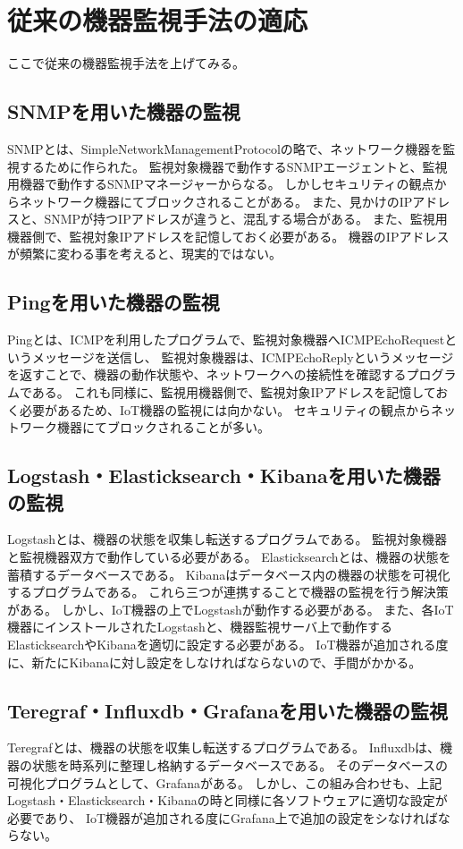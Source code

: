 \section{従来の機器監視手法の適応}
ここで従来の機器監視手法を上げてみる。
\subsection{SNMPを用いた機器の監視}
	SNMPとは、SimpleNetworkManagementProtocolの略で、ネットワーク機器を監視するために作られた。
	監視対象機器で動作するSNMPエージェントと、監視用機器で動作するSNMPマネージャーからなる。
	しかしセキュリティの観点からネットワーク機器にてブロックされることがある。
	また、見かけのIPアドレスと、SNMPが持つIPアドレスが違うと、混乱する場合がある。
	また、監視用機器側で、監視対象IPアドレスを記憶しておく必要がある。
	機器のIPアドレスが頻繁に変わる事を考えると、現実的ではない。
\subsection{Pingを用いた機器の監視}
	Pingとは、ICMPを利用したプログラムで、監視対象機器へICMPEchoRequestというメッセージを送信し、
	監視対象機器は、ICMPEchoReplyというメッセージを返すことで、機器の動作状態や、ネットワークへの接続性を確認するプログラムである。
	これも同様に、監視用機器側で、監視対象IPアドレスを記憶しておく必要があるため、IoT機器の監視には向かない。
	セキュリティの観点からネットワーク機器にてブロックされることが多い。
\subsection{Logstash・Elasticksearch・Kibanaを用いた機器の監視}
	Logstashとは、機器の状態を収集し転送するプログラムである。
	監視対象機器と監視機器双方で動作している必要がある。
	Elasticksearchとは、機器の状態を蓄積するデータベースである。
	Kibanaはデータベース内の機器の状態を可視化するプログラムである。
	これら三つが連携することで機器の監視を行う解決策がある。
	しかし、IoT機器の上でLogstashが動作する必要がある。
	また、各IoT機器にインストールされたLogstashと、機器監視サーバ上で動作するElasticksearchやKibanaを適切に設定する必要がある。
	IoT機器が追加される度に、新たにKibanaに対し設定をしなければならないので、手間がかかる。
\subsection{Teregraf・Influxdb・Grafanaを用いた機器の監視}
	Teregrafとは、機器の状態を収集し転送するプログラムである。
	Influxdbは、機器の状態を時系列に整理し格納するデータベースである。
	そのデータベースの可視化プログラムとして、Grafanaがある。
	しかし、この組み合わせも、上記Logstash・Elasticksearch・Kibanaの時と同様に各ソフトウェアに適切な設定が必要であり、
	IoT機器が追加される度にGrafana上で追加の設定をシなければならない。


